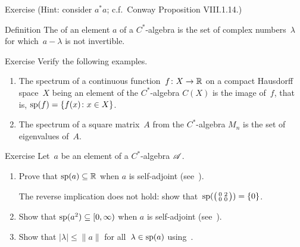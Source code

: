 \documentclass[a]{subfiles}
\begin{document}
\begin{parsec}
\begin{point}{Exercise}
(Hint: consider $a^*a$; c.f.~Conway Proposition VIII.1.14.)
\end{point}
\begin{point}{Definition}%
The %
of an element $a$
of a $C^*$-algebra
is the set %
of complex numbers~$\lambda$
for which~$a-\lambda$ is not invertible.
\end{point}
\begin{point}{Exercise}%
Verify the following examples.
\begin{enumerate}
\item
The spectrum of a continuous function~$f\colon X\to \mathbb{R}$
on a compact Hausdorff space~$X$
being an element of the $C^*$-algebra $C(X)$
is the image of~$f$, that is,
$\mathrm{sp}(f) = \{f(x)\colon x\in X\}$.
\item
The spectrum of a square matrix~$A$
from the $C^*$-algebra $M_n$
is the set of eigenvalues of~$A$.
\end{enumerate}
\end{point}
\begin{point}{Exercise}%
Let~$a$ be an element of a $C^*$-algebra $\mathscr{A}$.
\begin{enumerate}
\item
Prove that $\mathrm{sp}(a)\subseteq \mathbb{R}$ when $a$ is self-adjoint
(see~).

The reverse implication does not hold:
show that~$\mathrm{sp}(\bigl(
\begin{smallmatrix}0&2\\0&0\end{smallmatrix}\bigr))=\{0\}$.

\item
Show that $\mathrm{sp}(a^2)\subseteq [0,\infty)$ when $a$ is self-adjoint
(see~).

\item
Show that $|\lambda|\leq \|a\|$ for all~$\lambda\in\mathrm{sp}(a)$
using~.


\end{enumerate}
\end{point}
\end{parsec}
\end{document}
